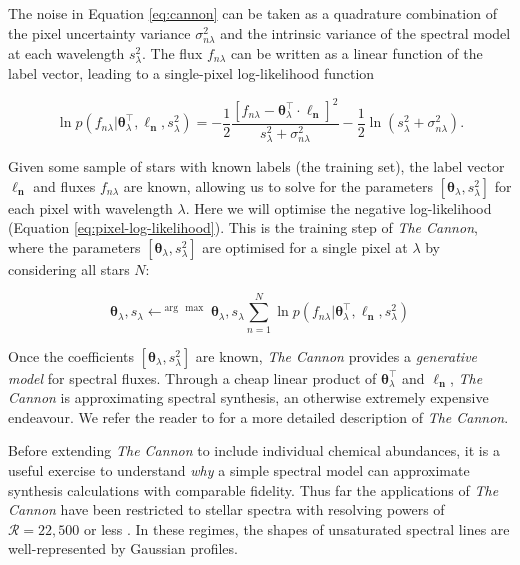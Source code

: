 \documentclass[useAMS,usenatbib]{mn2e}
\newcommand\tc{\textit{The Cannon}}
\newcommand\lv{\mathbf{\boldsymbol\ell_n}}
\newcommand\cv{{\boldsymbol\theta}_\lambda}
\newcommand\ssq{s_\lambda^2}
\newcommand\given{|}
\begin{document}
The noise in Equation \ref{eq:cannon} can be taken as a quadrature combination of the pixel uncertainty variance $\sigma_{n\lambda}^2$ and the intrinsic variance of the spectral model at each wavelength $s_\lambda^2$. The flux $f_{n\lambda}$ can be written as a linear function of the label vector, leading to a single-pixel log-likelihood function

\begin{equation}
\ln{p}\left(f_{n\lambda}\given\cv^\intercal,\lv, s_{\lambda}^2\right) = -\frac{1}{2}\frac{\left[f_{n\lambda} - \cv^{\intercal}\cdot\lv\right]^2}{s_\lambda^2 + \sigma_{n\lambda}^2} -\frac{1}{2}\ln\left(s_{\lambda}^2 + \sigma_{n\lambda}^2\right).
\label{eq:pixel-log-likelihood}
\end{equation}

Given some sample of stars with known labels (the training set), the label vector $\lv$ and fluxes $f_{n\lambda}$ are known, allowing us to solve for the parameters $[\cv,s_\lambda^2]$ for each pixel with wavelength $\lambda$. Here we will optimise the negative log-likelihood (Equation \ref{eq:pixel-log-likelihood}). This is the training step of \tc{}, where the parameters $[\cv,s_\lambda^2]$ are optimised for a single pixel at $\lambda$ by considering all stars $N$:

\begin{equation}
\cv,s_\lambda \leftarrow^{\arg\,\max} {\cv, s_\lambda} \sum_{n=1}^N \ln{p}\left(f_{n\lambda}\given\cv^\intercal,\lv,s_\lambda^2\right)
\end{equation}

Once the coefficients $[\cv,\ssq]$ are known, \tc{} provides a \textit{generative model} for spectral fluxes. Through a cheap linear product of $\cv^\intercal$ and $\lv$, \tc{} is approximating spectral synthesis, an otherwise extremely expensive endeavour. We refer the reader to \citet{Ness15a} for a more detailed description of \tc{}. 

Before extending \tc{} to include individual chemical abundances, it is
a useful exercise to understand \textit{why} a simple spectral model can 
approximate synthesis calculations with comparable fidelity. Thus far the applications of \tc{} have been restricted to stellar spectra with resolving powers of $\mathcal{R} = 22,500$ \citep[APOGEE;][]{Ness15a} or less \citep[e.g., LAMOST;][]{Ho15}. In these regimes, the shapes of unsaturated spectral lines are well-represented by Gaussian profiles. 



\end{document}
